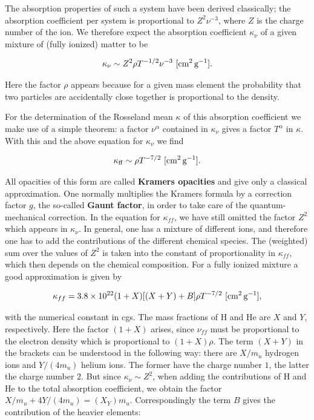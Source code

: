 \documentclass[a4paper,10pt]{article}
\begin{document}
{\noindent}The absorption properties of such a system have been derived classically; the absorption coefficient per system is proportional to $Z^2\nu^{-3}$, where $Z$ is the charge number of the ion. We therefore expect the absorption coefficient $\kappa_\nu$ of a given mixture of (fully ionized) matter to be

\begin{align*}
    \kappa_\nu \sim Z^2\rho T^{-1/2}\nu^{-3} ~ [{\rm cm^2\,g^{-1}}].
\end{align*}

{\noindent}Here the factor $\rho$ appears because for a given mass element the probability that two particles are accidentally close together is proportional to the density.

{\noindent}For the determination of the Rosseland mean $\kappa$ of this absorption coefficient we make use of a simple theorem: a factor $\nu^\alpha$ contained in $\kappa_\nu$ gives a factor $T^\alpha$ in $\kappa$. With this and the above equation for $\kappa_\nu$ we find

\begin{align*}
    \kappa_{\rm ff} \sim \rho T^{-7/2} ~ [{\rm cm^2\,g^{-1}}].
\end{align*}

{\noindent}All opacities of this form are called \textbf{Kramers opacities} and give only a classical approximation. One normally multiplies the Kramers formula by a correction factor $g$, the so-called \textbf{Gaunt factor}, in order to take care of the quantum-mechanical correction. In the equation for $\kappa_{ff}$, we have still omitted the factor $Z^2$ which appears in $\kappa_\nu$. In general, one has a mixture of different ions, and therefore one has to add the contributions of the different chemical species. The (weighted) sum over the values of $Z^2$ is taken into the constant of proportionality in $\kappa_{ff}$, which then depends on the chemical composition. For a fully ionized mixture a good approximation is given by

\begin{align*}
    \kappa_{ff} = 3.8\times10^{22} (1+X)[(X+Y)+B]\rho T^{-7/2} ~ [{\rm cm^2\,g^{-1}}],
\end{align*}

{\noindent}with the numerical constant in cgs. The mass fractions of H and He are $X$ and $Y$, respectively. Here the factor $(1+X)$ arises, since $\nu_{ff}$ must be proportional to the electron density which is proportional to $(1+X)\rho$. The term $(X+Y)$ in the brackets can be understood in the following way: there are $X/m_u$ hydrogen ions and $Y/(4m_u)$ helium ions. The former have the charge number $1$, the latter the charge number $2$. But since  $\kappa_\nu\sim Z^2$, when adding the contributions of H and He to the total absorption coefficient, we obtain the factor $X/m_u+4Y/(4m_u) = (X_Y)m_u$. Correspondingly the term $B$ gives the contribution of the heavier elements:
\end{document}
